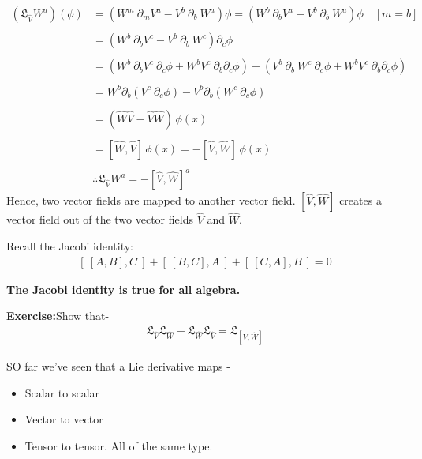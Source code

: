 \documentclass[14pt]{article} %
\begin{document}
\begin{align*}
(\mathfrak{L}_{\hat{V}} W^a)(\phi) & = (W^m~\partial_m V^a - V^b~ \partial_b ~W^a)\phi= (W^b~\partial_b V^a - V^b~ \partial_b ~W^a) \phi \quad[m=b] \\\\
& = (W^b~\partial_b V^c - V^b~ \partial_b ~W^c) \partial_c \phi \\\\
&= (W^b~\partial_b V^c ~\partial_c \phi + W^b V^c~\partial_b \partial_c \phi) - (V^b~ \partial_b ~W^c~\partial_c \phi + W^b V^c~\partial_b \partial_c \phi) \\\\
&= W^b \partial_b (V^c ~ \partial_c \phi) - V^b \partial_b (W^c ~ \partial_c \phi) \\\\
& = ( \hat{W} \hat{V} - \hat{V} \hat{W})\, \phi(x) \\\\
& =[ \hat{W}, \hat{V} ]\, \phi(x) = -[ \hat{V}, \hat{W} ]\, \phi(x)\\\\
& \boxed{\therefore \mathfrak{L}_{\hat{V}} W^a = -[\hat{V}, \hat{W}]^a}
\end{align*}
Hence, two vector fields are mapped to another vector field. 
$[ \hat{V}, \hat{W}]$ creates a vector field out of the two vector fields $\hat{V}$ and $\hat{W}$.
\begin{tcolorbox}[ title=Note:]
Recall the Jacobi identity:
\begin{align*}
\left[~ [ A, B], C~ \right] + \left[ ~[ B, C], A~ \right] + \left[~[ C, A ], B~ \right] = 0
\end{align*}
\begin{center}
    \textbf{The Jacobi identity is true for all algebra.}
\end{center}
\end{tcolorbox}
\begin{framed}
\noindent
\textbf{Exercise:}\quad Show that-
\begin{align*}
\mathfrak{L}_{\hat{V}} \mathfrak{L}_{\hat{W}} - \mathfrak{L}_{\hat{W}} \mathfrak{L}_{\hat{V}} = \mathfrak{L}_{[\hat{V},\hat{W}]}
\end{align*}
\end{framed}
SO far we've seen that a Lie derivative maps -
\begin{itemize}
    \item Scalar to scalar
    \item Vector to vector
    \item Tensor to tensor. All of the same type.
\end{itemize}
\end{document}
